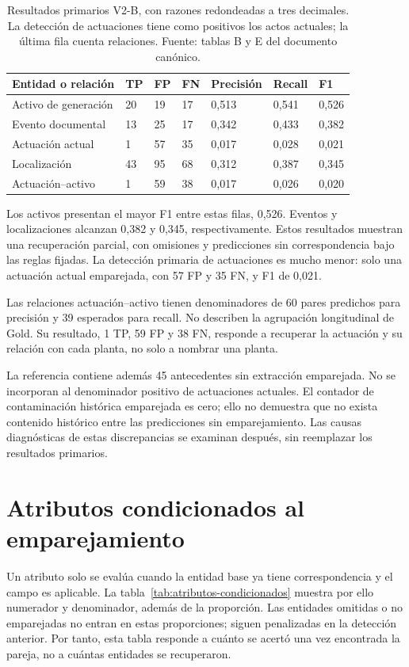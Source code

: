 \begin{table}[htbp]
\centering
\small
\renewcommand{\arraystretch}{1.2}
\begin{tabular}{L{4.3cm} C{0.7cm} C{0.7cm} C{0.7cm} C{1.7cm} C{1.5cm} C{1.3cm}}
\hline
Entidad o relación & TP & FP & FN & Precisión & Recall & F1 \\
\hline
Activo de generación & 20 & 19 & 17 & 0,513 & 0,541 & 0,526 \\
Evento documental & 13 & 25 & 17 & 0,342 & 0,433 & 0,382 \\
Actuación actual & 1 & 57 & 35 & 0,017 & 0,028 & 0,021 \\
Localización & 43 & 95 & 68 & 0,312 & 0,387 & 0,345 \\
Actuación--activo & 1 & 59 & 38 & 0,017 & 0,026 & 0,020 \\
\hline
\end{tabular}
\caption[Detección primaria de entidades y relaciones]{Resultados primarios
V2-B, con razones redondeadas a tres decimales. La detección de actuaciones
tiene como positivos los actos actuales; la última fila cuenta relaciones.
Fuente: tablas B y E del documento canónico.}
\label{tab:metricas-entidades}
\end{table}

Los activos presentan el mayor F1 entre estas filas, 0,526. Eventos y
localizaciones alcanzan 0,382 y 0,345, respectivamente. Estos resultados
muestran una recuperación parcial, con omisiones y predicciones sin
correspondencia bajo las reglas fijadas. La detección primaria de actuaciones
es mucho menor: solo una actuación actual emparejada, con 57 FP y 35 FN,
y F1 de 0,021.

Las relaciones actuación--activo tienen denominadores de 60 pares predichos
para precisión y 39 esperados para recall. No describen la agrupación
longitudinal de Gold. Su resultado, 1 TP, 59 FP y 38 FN, responde a recuperar
la actuación y su relación con cada planta, no solo a nombrar una planta.

La referencia contiene además 45 antecedentes sin extracción emparejada.
No se incorporan al denominador positivo de actuaciones actuales.
El contador de contaminación histórica emparejada es cero; ello no demuestra
que no exista contenido histórico entre las predicciones sin emparejamiento.
Las causas diagnósticas de estas discrepancias se examinan después, sin
reemplazar los resultados primarios.

\section{Atributos condicionados al emparejamiento}
Un atributo solo se evalúa cuando la entidad base ya tiene correspondencia
y el campo es aplicable. La tabla~\ref{tab:atributos-condicionados} muestra
por ello numerador y denominador, además de la proporción. Las entidades
omitidas o no emparejadas no entran en estas proporciones; siguen penalizadas
en la detección anterior. Por tanto, esta tabla responde a cuánto se acertó
una vez encontrada la pareja, no a cuántas entidades se recuperaron.


